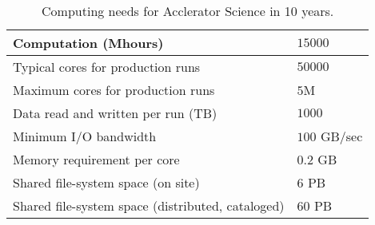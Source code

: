 \begin{table}[t]
\begin{center}
\caption{Computing needs for Acclerator Science in 10 years.}
\begin{tabular}{|l|l|} 
 \hline 
 Computation (Mhours) & $15000$ \\ \hline
 Typical cores for production runs & $50000$ \\ \hline
 Maximum cores for production runs & $5$M\\ \hline
 Data read and written per run (TB) & $1000$\\ \hline
 Minimum I/O bandwidth & $100$ GB/sec\\ \hline
 Memory requirement per core & $0.2$ GB \\ \hline
Shared file-system space (on site) & $6$ PB\\ \hline
Shared file-system space (distributed, cataloged) & $60$ PB\\ \hline
\end{tabular}
\label{tab:CompNeeds}
\end{center}
\end{table}

